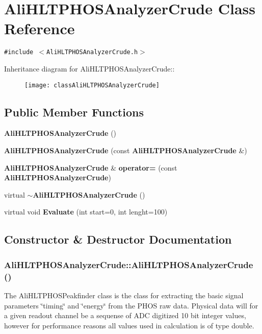 \section{Ali\-HLTPHOSAnalyzer\-Crude Class Reference}
\label{classAliHLTPHOSAnalyzerCrude}
{\tt \#include $<$Ali\-HLTPHOSAnalyzer\-Crude.h$>$}

Inheritance diagram for Ali\-HLTPHOSAnalyzer\-Crude::\begin{figure}[H]
\begin{center}
\leavevmode
\texttt{[image: classAliHLTPHOSAnalyzerCrude]}
\end{center}
\end{figure}
\subsection*{Public Member Functions}
\begin{CompactItemize}
\item 
{\bf Ali\-HLTPHOSAnalyzer\-Crude} ()
\item 
{\bf Ali\-HLTPHOSAnalyzer\-Crude} (const {\bf Ali\-HLTPHOSAnalyzer\-Crude} \&)
\item 
{\bf Ali\-HLTPHOSAnalyzer\-Crude} \& {\bf operator=} (const {\bf Ali\-HLTPHOSAnalyzer\-Crude})
\item 
virtual {\bf $\sim$Ali\-HLTPHOSAnalyzer\-Crude} ()
\item 
virtual void {\bf Evaluate} (int start=0, int lenght=100)
\end{CompactItemize}


\subsection{Constructor \& Destructor Documentation}
\subsubsection{\setlength{\rightskip}{0pt plus 5cm}Ali\-HLTPHOSAnalyzer\-Crude::Ali\-HLTPHOSAnalyzer\-Crude ()}\label{classAliHLTPHOSAnalyzerCrude_a0}


The Ali\-HLTPHOSPeakfinder class is the class for extracting the basic signal parameters \char`\"{}timing\char`\"{} and \char`\"{}energy\char`\"{} from the PHOS raw data. Physical data will for a given readout channel be a sequense of ADC digitized 10 bit integer values, however for performance reasons all values used in calculation is of type double. 
